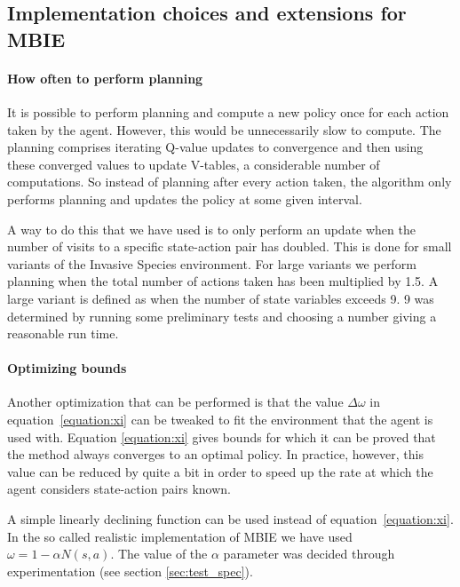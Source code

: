 \subsection{Implementation choices and extensions for MBIE}
\label{sec:MBIE_our_contribution}

\paragraph{How often to perform planning}
\label{sec:mbie_perform_planning}

It is possible to perform planning and compute a new policy once for each
action taken by the agent. However, this would be unnecessarily slow to
compute. The planning comprises iterating Q-value updates to convergence and
then using these converged values to update V-tables, a considerable number of
computations. So instead of planning after every action taken, the algorithm
only performs planning and updates the policy at some given interval. 

A way to do this that we have used is to only perform an update when the number 
of visits to a specific state-action pair has doubled. This is
done for small variants of the Invasive Species environment. For large variants
we perform planning when the total number of actions taken has been multiplied
by 1.5. A large variant is defined as when the number of state variables
exceeds 9. 9 was determined by running some preliminary tests and
choosing a number giving a reasonable run time.

\paragraph{Optimizing bounds}

Another optimization that can be performed is that the value $\Delta \omega$ in
equation~\eqref{equation:xi} can be tweaked to fit the environment that the
agent is used with. Equation \eqref{equation:xi} gives bounds for which it can
be proved that the method always converges to an optimal policy. In practice,
however, this value can be reduced by quite a bit in order to speed up the rate
at which the agent considers state-action pairs known. 

A simple linearly declining function can be used instead of
equation~\eqref{equation:xi}. In the so called realistic implementation of MBIE we have
used $\omega = 1 - \alpha N(s,a).$ The value of the $\alpha$ parameter was decided through experimentation (see section \ref{sec:test_spec}).

